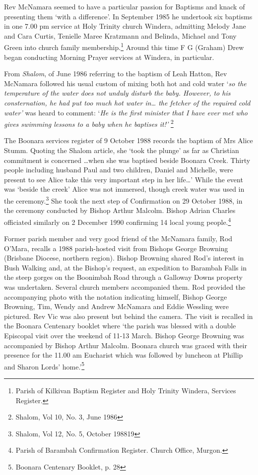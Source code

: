 Rev McNamara seemed to have a particular passion for Baptisms and knack of presenting them `with a difference'. In September 1985 he undertook six baptisms in one 7.00 pm service at Holy Trinity church Windera, admitting Melody Jane and Cara Curtis, Tenielle Maree Kratzmann and Belinda, Michael and Tony Green into church family membership.\footnote{Parish of Kilkivan Baptism Register and Holy Trinity Windera, Services Register.} Around this time F G (Graham) Drew began conducting Morning Prayer services at Windera, in particular.


From \emph{Shalom}, of June 1986 referring to the baptism of Leah Hatton, Rev McNamara followed his usual custom of mixing both hot and cold water `\emph{so the temperature of the water does not unduly disturb the baby. However, to his consternation, he had put too much hot water in\ldots{} the fetcher of the required cold water'} was heard to comment: `\emph{He is the first minister that I have ever met who gives swimming lessons to a baby when he baptises it!'} \footnote{Shalom, Vol 10, No. 3, June 1986}


The Boonara services register of 9 October 1988 records the baptism of Mrs Alice Stumm. Quoting the Shalom article, she `took the plunge' as far as Christian commitment is concerned \ldots when she was baptised beside Boonara Creek. Thirty people including husband Paul and two children, Daniel and Michelle, were present to see Alice take this very important step in her life\ldots' While the event was `beside the creek' Alice was not immersed, though creek water was used in the ceremony.\footnote{Shalom, Vol 12, No. 5, October 198819} She took the next step of Confirmation on 29 October 1988, in the ceremony conducted by Bishop Arthur Malcolm. Bishop Adrian Charles officiated similarly on 2 December 1990 confirming 14 local young people.\footnote{Parish of Barambah Confirmation Register. Church Office, Murgon.}


Former parish member and very good friend of the McNamara family, Rod O'Mara, recalls a 1988 parish-hosted visit from Bishops George Browning (Brisbane Diocese, northern region). Bishop Browning shared Rod's interest in Bush Walking and, at the Bishop's request, an expedition to Barambah Falls in the steep gorges on the Boonimbah Road through a Galloway Downs property was undertaken. Several church members accompanied them. Rod provided the accompanying photo with the notation indicating himself, Bishop George Browning, Tim, Wendy and Andrew McNamara and Eddie Wessling were pictured. Rev Vic was also present but behind the camera. The visit is recalled in the Boonara Centenary booklet where `the parish was blessed with a double Episcopal visit over the weekend of 11-13 March. Bishop George Browning was accompanied by Bishop Arthur Malcolm. Boonara church was graced with their presence for the 11.00 am Eucharist which was followed by luncheon at Phillip and Sharon Lords' home.'\footnote{Boonara Centenary Booklet, p. 28}


